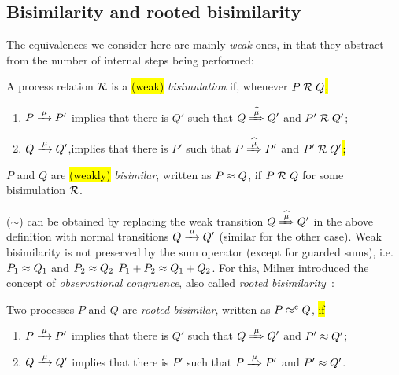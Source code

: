 \subsection{Bisimilarity and rooted bisimilarity}
\label{ss:BiEx}

The equivalences we consider here are mainly \emph{weak} ones, in that they
abstract from the number of internal steps being performed:
\begin{definition}%
\label{d:wb}
A process relation ${{\cal R}}$ is a \hl{(weak)} \emph{bisimulation} if, whenever
 $P\mathrel{\cal R} Q$\hl{,} %
\begin{enumerate}
\item $P \arr\mu P'$ implies that there is $Q'$ such that $Q \Arcap \mu Q'$ and $P' \mathrel{\cal R} Q'$;
\item $Q \arr\mu Q'$,implies that there is $P'$ such that $P \Arcap
  \mu P'$ and $P' \mathrel{\cal R} Q'$\hl{;}
\end{enumerate}
 $P$ and $Q$ are \hl{(weakly)} \emph{bisimilar},
written as $P \approx Q$, if $P \mathrel{\cal R} Q$ for some bisimulation ${\cal R}$.
\end{definition}

 ($\sim$)
can be obtained by replacing the weak transition $Q\Arcap\mu Q'$ in the above
definition with normal transitions $Q \arr \mu Q'$ (similar for the other case).
Weak bisimilarity is not preserved by the sum operator (except for
guarded sums), i.e.\  $P_1 \approx Q_1$ and $P_2 \approx Q_2$  
 $P_1 + P_2 \approx Q_1 + Q_2$.
For this, Milner introduced the concept of \emph{observational congruence}, also called \emph{rooted
  bisimilarity}~\cite{Gorrieri:2015jt,Sangiorgi:2011ut}:
\begin{definition}%
\label{d:rootedBisimilarity}
Two processes $P$ and $Q$ are \emph{rooted bisimilar}, written as $P
\mathrel{\approx^{\rm{c}}} Q$, \hl{if} %
\begin{enumerate}
 \item  $P \arr\mu P'$ implies that there is $Q'$ such that $Q
   \Arr\mu Q'$ and $P' \approx Q'$;
 \item  $Q \arr\mu Q'$ implies that there is $P'$ such that $P
   \Arr\mu P'$ and $P' \approx Q'$\enspace.
\end{enumerate}
\end{definition}

